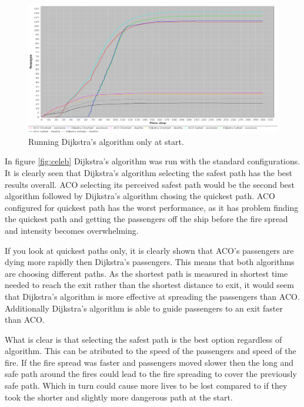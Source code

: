 \begin{figure} [h]
\centering
\hspace*{-1.0in}
\includegraphics[scale=0.35]{images/Graph-using-1000-rounds-140-passangers-and-one-fire-dijkstra-one-time.png}
\caption{Running Dijkstra's algorithm only at start.}
\label{fig:celebDF}
\end{figure}

In figure \ref{fig:celeb} Dijkstra's algorithm was run with the standard configurations. It is clearly seen that Dijkstra's algorithm selecting the safest path has the best results overall. ACO selecting its perceived safest path would be the second best algorithm followed by Dijkstra's algorithm chosing the quickest path. ACO configured for quickest path has the worst performance, as it has problem finding the quickest path and getting the passengers off the ship before the fire spread and intensity becomes overwhelming.

If you look at quickest paths only, it is clearly shown that ACO's passengers are dying more rapidly then Dijkstra's passengers. This means that both algorithms are choosing different paths. As the shortest path is measured in shortest time needed to reach the exit rather than the shortest distance to exit, it would seem that Dijkstra's algorithm is more effective at spreading the passengers than ACO. Additionally Dijkstra's algorithm is able to guide passengers to an exit faster than ACO.

What is clear is that selecting the safest path is the best option regardless of algorithm. This can be atributed to the speed of the passengers and speed of the fire. If the fire spread was faster and passengers moved slower then the long and safe path around the fires could lead to the fire spreading to cover the previously safe path. Which in turn could cause more lives to be lost compared to if they took the shorter and slightly more dangerous path at the start.

